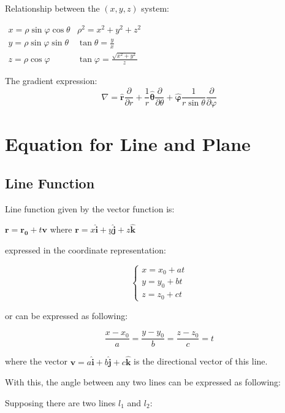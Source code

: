 \documentclass[UTF8,a4paper, 10pt, openany]{svmono}
\begin{document}
\begin{enumerate}
Relationship between the $(x, y, z)$ system:
\begin{center}
$\begin{array}{cc}
x = \rho \sin \varphi \cos \theta &  \rho ^2 = x^2+y^2+z^2\\
y = \rho \sin \varphi \sin \theta &  \tan \theta = \frac{y}{x}\\
z = \rho \cos \varphi  &  \tan \varphi = \frac{\sqrt{x^2+y^2}}{z}
\end{array}$
\end{center}

The gradient expression:
\begin{equation}
 \boxed{\nabla = \mathbf{\hat{r}}\frac{\partial }{\partial r}+\frac{1}{r}\mathbf{\hat{\theta}}\frac{\partial }{\partial \theta}+\mathbf{\hat{\varphi}}\frac{1}{r\sin \theta}\frac{\partial }{\partial \varphi}}
\end{equation}
\end{enumerate}




\section{Equation for Line and Plane}
\subsection{Line Function}
Line function given by the vector function is:

\begin{center}
$\mathbf{r}=\mathbf{r_0}+t\mathbf{v}$
where $\mathbf{r}=x\mathbf{\hat{i}}+y\mathbf{\hat{j}}+z\mathbf{\hat{k}}$
\end{center}

expressed in the coordinate representation:

\[\begin{cases}
x=x_0+at \\
y=y_0+bt \\
z=z_0+ct
\end{cases}\]

or can be expressed as following:

\[\frac{x-x_0}{a}=\frac{y-y_0}{b}=\frac{z-z_0}{c}=t\]

where the vector $\mathbf{v}=a\mathbf{\hat{i}}+b\mathbf{\hat{j}}+c\mathbf{\hat{k}}$ is the directional vector of this line.

With this, the angle between any two lines can be expressed as following:

Supposing there are two lines $l_1$ and $l_2$:
\end{document}
